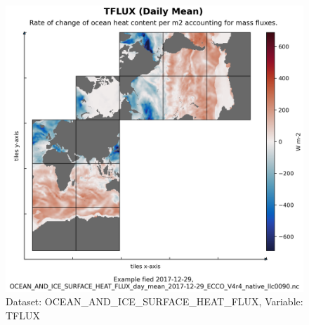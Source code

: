 \begin{figure}[H]
\centering
\includegraphics[scale=0.55]{../images/plots/native_plots/Ocean_and_Sea-Ice_Surface_Heat_Fluxes/TFLUX.png}
\caption{Dataset: OCEAN\_AND\_ICE\_SURFACE\_HEAT\_FLUX, Variable: TFLUX}
\label{tab:table-OCEAN_AND_ICE_SURFACE_HEAT_FLUX_TFLUX-Plot}
\end{figure}
\pagebreak
